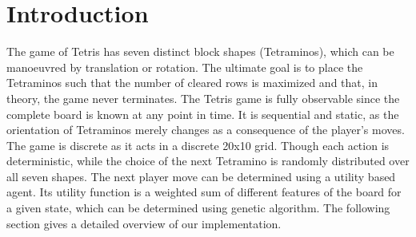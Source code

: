 \section{Introduction}
\label{sec:problem}
The game of Tetris has seven distinct block shapes (Tetraminos), which can be manoeuvred by translation or rotation. The ultimate goal is to place the Tetraminos such that the number of cleared rows is maximized and that, in theory, the game never terminates.  
\newline
The Tetris game is fully observable since the complete board is known at any point in time. It is sequential and static, as the orientation of Tetraminos merely changes as a consequence of the player's moves. The game is discrete as it acts in a discrete 20x10 grid. Though each action is deterministic, while the choice of the next Tetramino is randomly distributed over all seven shapes.
\newline
The next player move can be determined using a utility based agent. Its utility function is a weighted sum of different features of the board for a given state, which can be determined using genetic algorithm. The following section gives a detailed overview of our implementation.
\vspace{-0.8cm}
